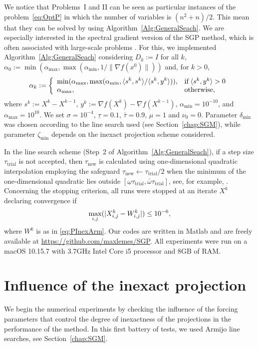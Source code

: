 We notice that Problems~I and II can be seen as particular instances of the problem~\eqref{eq:OptP} in which the number of variables is $(n^2+n)/2$. This mean that they can be solved by using Algorithm~\ref{Alg:GeneralSeach}.
We are especially interested in the spectral gradient version \cite{BirginMartinezRaydan2003,spgsiam} of the SGP method, which is often associated with large-scale problems \cite{JSSv060i03}. For this, we implemented Algorithm~\ref{Alg:GeneralSeach} considering $D_k:=I$ for all $k$, $\alpha_0 := \min(\alpha_{\max}, \max(\alpha_{\min}, 1/ \| \nabla f(x^0) \|))$ and, for $k>0$,
\begin{equation*}\label{spg}
	\alpha_k:=\left\{\begin{array}{ll}
		\displaystyle\min (\alpha_{\max},\max (\alpha_{\min},\langle s^k,s^k\rangle/\langle s^k,y^k\rangle)), & \mbox{if} \; \langle s^k,y^k\rangle > 0 \\
		\alpha_{\max},                                                                              & \mbox{otherwise},
	\end{array}\right.
\end{equation*}
where $s^k:=X^k - X^{k-1}$, $y^k:=\nabla f(X^k) - \nabla f(X^{k-1})$, $\alpha_{\min}=10^{-10}$, and $\alpha_{\max}=10^{10}$.
We set $\sigma = 10^{ -4}$, $\underline\tau=0.1$, $\bar\tau=0.9$, $\mu=1$ and $\nu_0=0$. Parameter $\delta_{\min}$ was chosen according to the line search used (see Section~\ref{chap:SGM}), while parameter $\zeta_{\min}$ depends on the inexact projection scheme considered.

In the line search scheme (Step~2 of Algorithm~\ref{Alg:GeneralSeach}), if a step size $\tau_{\textrm{trial}}$  is not accepted, then $\tau_{\textrm{new}}$ is calculated using one-dimensional quadratic interpolation employing the safeguard $\tau_{\textrm{new}}\gets \tau_{\textrm{trial}}/2$  when the minimum of the one-dimensional quadratic lies outside $[\underline\omega \tau_{\textrm{trial}}, \bar\omega \tau_{\textrm{trial}} ]$, see, for example,  \cite[Section 3.5]{nocedal2006numerical}.
Concerning the stopping criterion, all runs were stopped at an iterate $X^k$ declaring convergence if
$$\displaystyle \max_{i,j} (|X^k_{i,j}-W^k_{i,j}| )\leq 10^{-6},$$
where $W^k$ is as in \eqref{eq:PInexArm}.
Our codes are written in Matlab and are freely available at \url{https://github.com/maxlemes/SGP}. All experiments were run on a macOS 10.15.7 with 3.7GHz Intel Core i5 processor and 8GB of RAM.
\section{Influence of the inexact projection} \label{sec:forcing}
We begin the numerical experiments by checking the influence of the forcing parameters that control the degree of inexactness of the projections in the performance of the  method. In this first battery of tests, we used Armijo line searches, see Section~\ref{chap:SGM}.

